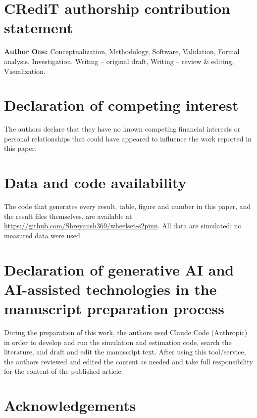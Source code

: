 \section*{CRediT authorship contribution statement}
\textbf{Author One:} Conceptualization, Methodology, Software, Validation, Formal analysis,
Investigation, Writing -- original draft, Writing -- review \& editing, Visualization.

\section*{Declaration of competing interest}
The authors declare that they have no known competing financial interests or personal relationships
that could have appeared to influence the work reported in this paper.

\section*{Data and code availability}
The code that generates every result, table, figure and number in this paper, and the result files
themselves, are available at \url{https://github.com/Shreyansh369/wheelset-s2pinn}. All data are
simulated; no measured data were used.

\section*{Declaration of generative AI and AI-assisted technologies in the manuscript preparation process}
During the preparation of this work, the authors used Claude Code (Anthropic) in order to develop and
run the simulation and estimation code, search the literature, and draft and edit the manuscript text.
After using this tool/service, the authors reviewed and edited the content as needed and take full
responsibility for the content of the published article.

\section*{Acknowledgements}
